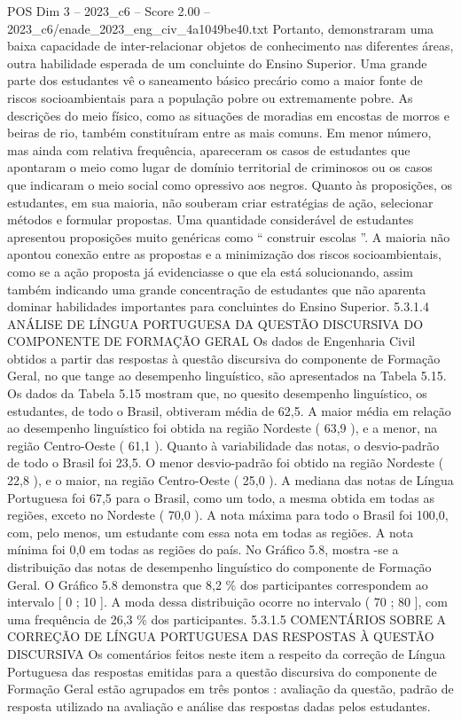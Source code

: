 \begin{textsample}{POS Dim 3 – 2023\_c6 – Score 2.00 – 2023\_c6/enade\_2023\_eng\_civ\_4a1049be40.txt}
Portanto, demonstraram uma baixa capacidade de inter-relacionar objetos de conhecimento nas diferentes áreas, outra habilidade esperada de um concluinte do Ensino Superior.
Uma grande parte dos estudantes vê o saneamento básico precário como a maior fonte de riscos socioambientais para a população pobre ou extremamente pobre.
As descrições do meio físico, como as situações de moradias em encostas de morros e beiras de rio, também constituíram entre as mais comuns.
Em menor número, mas ainda com relativa frequência, apareceram os casos de estudantes que apontaram o meio como lugar de domínio territorial de criminosos ou os casos que indicaram o meio social como opressivo aos negros.
Quanto às proposições, os estudantes, em sua maioria, não souberam criar estratégias de ação, selecionar métodos e formular propostas.
Uma quantidade considerável de estudantes apresentou proposições muito genéricas como “ construir escolas ”.
A maioria não apontou conexão entre as propostas e a minimização dos riscos socioambientais, como se a ação proposta já evidenciasse o que ela está solucionando, assim também indicando uma grande concentração de estudantes que não aparenta dominar habilidades importantes para concluintes do Ensino Superior. 5.3.1.4 ANÁLISE DE LÍNGUA PORTUGUESA DA QUESTÃO DISCURSIVA DO COMPONENTE DE FORMAÇÃO GERAL Os dados de Engenharia Civil obtidos a partir das respostas à questão discursiva do componente de Formação Geral, no que tange ao desempenho linguístico, são apresentados na Tabela 5.15.
Os dados da Tabela 5.15 mostram que, no quesito desempenho linguístico, os estudantes, de todo o Brasil, obtiveram média de 62,5.
A maior média em relação ao desempenho linguístico foi obtida na região Nordeste ( 63,9 ), e a menor, na região Centro-Oeste ( 61,1 ).
Quanto à variabilidade das notas, o desvio-padrão de todo o Brasil foi 23,5.
O menor desvio-padrão foi obtido na região Nordeste ( 22,8 ), e o maior, na região Centro-Oeste ( 25,0 ).
A mediana das notas de Língua Portuguesa foi 67,5 para o Brasil, como um todo, a mesma obtida em todas as regiões, exceto no Nordeste ( 70,0 ).
A nota máxima para todo o Brasil foi 100,0, com, pelo menos, um estudante com essa nota em todas as regiões.
A nota mínima foi 0,0 em todas as regiões do país.
No Gráfico 5.8, mostra -se a distribuição das notas de desempenho linguístico do componente de Formação Geral.
O Gráfico 5.8 demonstra que 8,2 \% dos participantes correspondem ao intervalo [ 0 ; 10 ].
A moda dessa distribuição ocorre no intervalo ( 70 ; 80 ], com uma frequência de 26,3 \% dos participantes. 5.3.1.5 COMENTÁRIOS SOBRE A CORREÇÃO DE LÍNGUA PORTUGUESA DAS RESPOSTAS À QUESTÃO DISCURSIVA Os comentários feitos neste item a respeito da correção de Língua Portuguesa das respostas emitidas para a questão discursiva do componente de Formação Geral estão agrupados em três pontos : avaliação da questão, padrão de resposta utilizado na avaliação e análise das respostas dadas pelos estudantes.

\end{textsample}
